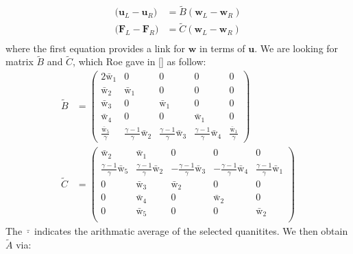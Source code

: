 \documentclass[a4paper]{article}
\numberwithin{equation}{section}
\begin{document}
\begin{equation}
    \begin{split}
        \big(\mathbf{u}_L - \mathbf{u}_R\big) &= \tilde{B}(\mathbf{w}_L - \mathbf{w}_R)\\
        \big(\mathbf{F}_L - \mathbf{F}_R\big) &= \tilde{C}(\mathbf{w}_L - \mathbf{w}_R)\\
    \end{split}
\end{equation}
where the first equation provides a link for $\mathbf{w}$ in terms of $\mathbf{u}$. We are looking for matrix $\tilde{B}$ and $\tilde{C}$, which Roe gave in [] as follow:
\begin{equation}
    \begin{split}
        \tilde{B} &=
        \begin{pmatrix}
            2 \bar{\mathrm{w}}_1 & 0 & 0 & 0 & 0\\
            \bar{\mathrm{w}}_2 & \bar{\mathrm{w}}_1 & 0 & 0 & 0\\
            \bar{\mathrm{w}}_3 & 0 & \bar{\mathrm{w}}_1 & 0 & 0\\
            \bar{\mathrm{w}}_4 & 0 & 0 &\bar{\mathrm{w}}_1 & 0 \\
           \frac{\bar{\mathrm{w}}_5}{\gamma} & \frac{\gamma - 1}{\gamma}\bar{\mathrm{w}}_2 & \frac{\gamma - 1}{\gamma }\bar{\mathrm{w}}_3 & \frac{\gamma - 1}{\gamma} \bar{\mathrm{w}}_4 & \frac{\bar{\mathrm{w}}_1}{\gamma}
        \end{pmatrix} \\
        \tilde{C} &= 
        \begin{pmatrix}
            \bar{\mathrm{w}}_2 & \bar{\mathrm{w}}_1 & 0 & 0 & 0\\
            \frac{\gamma - 1}{\gamma}\bar{\mathrm{w}}_5 & \frac{\gamma - 1}{\gamma}\bar{\mathrm{w}}_2 & -\frac{\gamma - 1}{\gamma}\bar{\mathrm{w}}_3 & -\frac{\gamma - 1}{\gamma} \bar{\mathrm{w}}_4 & \frac{\gamma - 1}{\gamma} \bar{\mathrm{w}}_1\\
            0 & \bar{\mathrm{w}}_3 & \bar{\mathrm{w}}_2 & 0 & 0\\
            0 & \bar{\mathrm{w}}_4 & 0 & \bar{\mathrm{w}}_2 & 0\\
            0 & \bar{\mathrm{w}}_5 & 0 & 0 & \bar{\mathrm{w}}_2\\
        \end{pmatrix}
    \end{split}
\end{equation}
The $\bar{\cdot}$ indicates the arithmatic average of the selected quanitites. We then obtain $\tilde{A}$ via:
\end{document}
